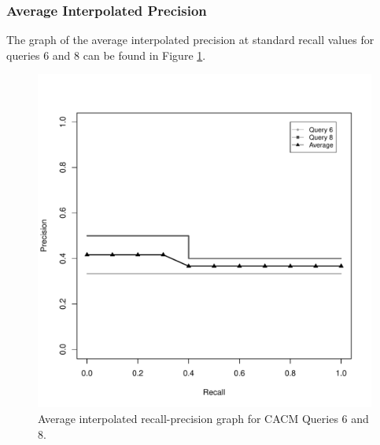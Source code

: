 \subsubsection{Average Interpolated Precision}
The graph of the average interpolated precision at standard recall values for queries 6 and 8 can be found in Figure \ref{fig:aiprgraph68}.

\begin{figure}[H]
\centering
\label{fig:aiprgraph68}
\includegraphics[scale=.6]{code/getrel/aipr68.pdf}
\caption{Average interpolated recall-precision graph for CACM Queries 6 and 8.}
\end{figure}




